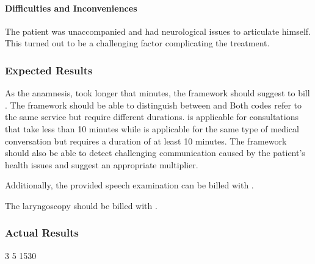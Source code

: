 \paragraph{Difficulties and Inconveniences}
The patient was unaccompanied and had neurological issues to articulate himself.
This turned out to be a challenging factor complicating the treatment.

\subsubsection{Expected Results}
As the anamnesis, took longer that  minutes, the framework should suggest to bill .
The framework should be able to distinguish between  and 
Both codes refer to the same service but require different durations.
 is applicable for consultations that take less than 10 minutes while  is applicable for the same type of medical conversation but requires a duration of at least 10 minutes.
The framework should also be able to detect challenging communication caused by the patient's health issues and suggest an appropriate multiplier.

Additionally, the provided speech examination can be billed with .

The laryngoscopy should be billed with .

\subsubsection{Actual Results}




3
5
1530

